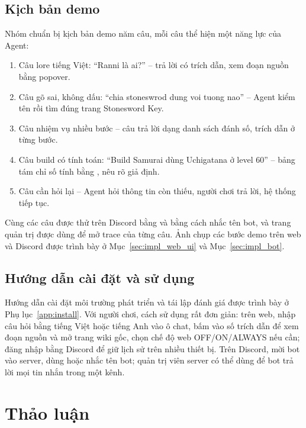 \subsection{Kịch bản demo}
\label{sec:demo}

Nhóm chuẩn bị kịch bản demo năm câu, mỗi câu thể hiện một năng lực của Agent:
\begin{enumerate}
    \item Câu lore tiếng Việt: ``Ranni là ai?'' -- trả lời có trích dẫn, xem đoạn nguồn bằng popover.
    \item Câu gõ sai, không dấu: ``chia stoneswrod dung voi tuong nao'' -- Agent kiểm tên rồi tìm đúng trang Stonesword Key.
    \item Câu nhiệm vụ nhiều bước -- câu trả lời dạng danh sách đánh số, trích dẫn ở từng bước.
    \item Câu build có tính toán: ``Build Samurai dùng Uchigatana ở level 60'' -- bảng tám chỉ số tính bằng , nêu rõ giả định.
    \item Câu cần hỏi lại -- Agent hỏi thông tin còn thiếu, người chơi trả lời, hệ thống tiếp tục.
\end{enumerate}
Cùng các câu được thử trên Discord bằng  và bằng cách nhắc tên bot, và trang quản trị được dùng để mở trace của từng câu. Ảnh chụp các bước demo trên web và Discord được trình bày ở Mục~\ref{sec:impl_web_ui} và Mục~\ref{sec:impl_bot}.

\subsection{Hướng dẫn cài đặt và sử dụng}
\label{sec:guide}

Hướng dẫn cài đặt môi trường phát triển và tái lập đánh giá được trình bày ở Phụ lục~\ref{app:install}. Với người chơi, cách sử dụng rất đơn giản: trên web, nhập câu hỏi bằng tiếng Việt hoặc tiếng Anh vào ô chat, bấm vào số trích dẫn để xem đoạn nguồn và mở trang wiki gốc, chọn chế độ web OFF/ON/ALWAYS nếu cần; đăng nhập bằng Discord để giữ lịch sử trên nhiều thiết bị. Trên Discord, mời bot vào server, dùng  hoặc nhắc tên bot; quản trị viên server có thể dùng  để bot trả lời mọi tin nhắn trong một kênh.

\section{Thảo luận}
\label{sec:discussion}

